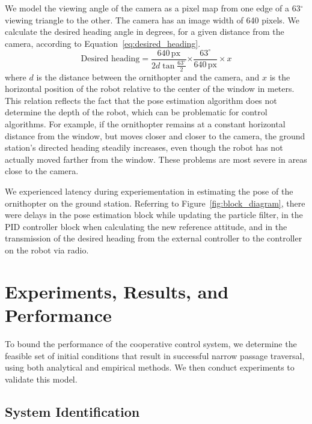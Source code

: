 \documentclass{aamas2013}
\begin{document}
We model the viewing angle of the camera as a pixel map from one edge of a 
63$^{\circ}$ viewing triangle to the other. The camera has an image width of 
640 pixels. We calculate the desired heading angle in degrees, for a given 
distance from the camera, according to Equation~\ref{eq:desired_heading}.
\begin{equation} 
\label{eq:desired_heading} 
\text{Desired heading} = \frac{640\,\text{px}}{2d\tan{\frac{63^{\circ}}{2}}}{\times\frac{63^{\circ}}{640\,\text{px}}\times x}
\end{equation}
where $d$ is the distance between the ornithopter and the camera, and $x$ is 
the horizontal position of the robot relative to the center of the window in 
meters. This relation reflects the fact that the pose estimation algorithm 
does not determine the depth of the robot, which can be problematic for 
control algorithms. For example, if the ornithopter remains at a constant 
horizontal distance from the window, but moves closer and closer to the 
camera, the ground station's directed heading steadily increases, even 
though the robot has not actually moved farther from the window. These 
problems are most severe in areas close to the camera.

We experienced latency during experiementation in estimating the pose of the
ornithopter on the ground station. Referring to
Figure~\ref{fig:block_diagram}, there were delays in the pose estimation block
while updating the particle filter, in the PID controller block when
calculating the new reference attitude, and in the transmission of the desired
heading from the external controller to the controller on the robot via radio.

\section{Experiments, Results, and Performance}
\label{sec:performance}
To bound the performance of the cooperative control system, we determine 
the feasible set of initial conditions that result in successful narrow 
passage traversal, using both analytical and empirical methods. We then 
conduct experiments to validate this model.

\subsection{System Identification}
\end{document}
